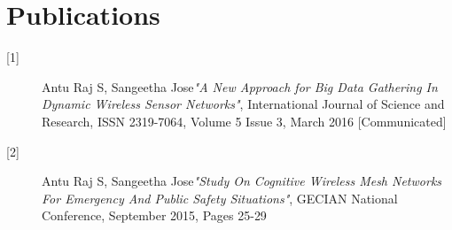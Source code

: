 \documentclass[MTech]{iitmdiss}
\begin{document}
  \chapter{Publications}  
\begin{description}
\item[{[1]}]Antu Raj S, Sangeetha Jose\textit{"A New Approach for Big Data Gathering In Dynamic Wireless Sensor Networks"}, International Journal of Science and Research, ISSN 2319-7064, Volume 5 Issue 3, March 2016 [Communicated]
\item[{[2]}]Antu Raj S, Sangeetha Jose\textit{"Study On Cognitive Wireless Mesh Networks For Emergency And Public Safety Situations"}, GECIAN National Conference, September 2015, Pages 25-29
\end{description}

\end{document}
